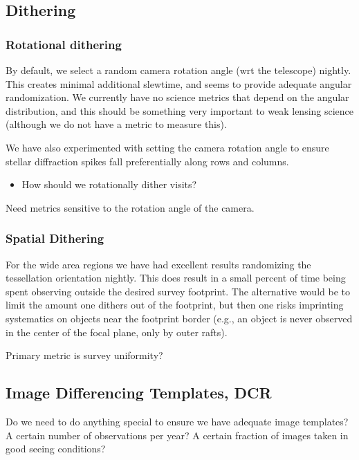 \subsection{Dithering}

\subsubsection{Rotational dithering}

By default, we select a random camera rotation angle (wrt the telescope) nightly. This creates minimal additional slewtime, and seems to provide adequate angular randomization.  We currently have no science metrics that depend on the angular distribution, and this should be something very important to weak lensing science (although we do not have a metric to measure this).

We have also experimented with setting the camera rotation angle to ensure stellar diffraction spikes fall preferentially along rows and columns. 

\begin{itemize}
    \item{How should we rotationally dither visits?}
\end{itemize}

Need metrics sensitive to the rotation angle of the camera. 

\subsubsection{Spatial Dithering}

For the wide area regions we have had excellent results randomizing the tessellation orientation nightly. This does result in a small percent of time being spent observing outside the desired survey footprint. The alternative would be to limit the amount one dithers out of the footprint, but then one risks imprinting systematics on objects near the footprint border (e.g., an object is never observed in the center of the focal plane, only by outer rafts).

Primary metric is survey uniformity?


\subsection{Image Differencing Templates, DCR}

Do we need to do anything special to ensure we have adequate image templates? A certain number of observations per year? A certain fraction of images taken in good seeing conditions? 

